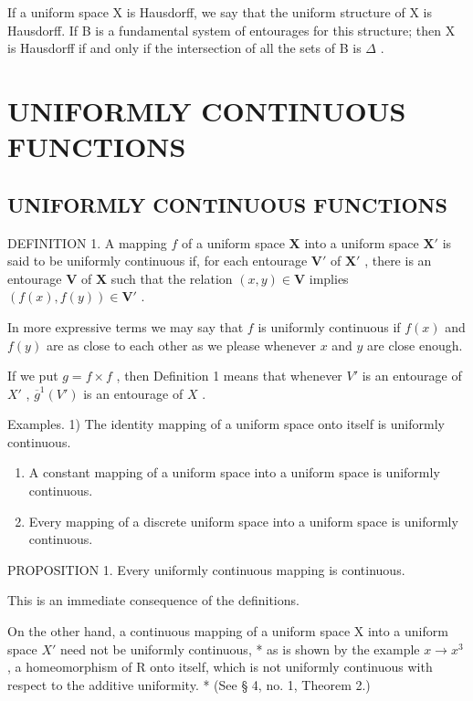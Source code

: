 If a uniform space X is Hausdorff, we say that the uniform structure of X is Hausdorff. If B is a fundamental system of entourages for this structure; then X is Hausdorff if and only if the intersection of all the sets of B is \(\Delta\) .

\section{UNIFORMLY CONTINUOUS FUNCTIONS}

\subsection{UNIFORMLY CONTINUOUS FUNCTIONS}

DEFINITION 1. A mapping \(f\) of a uniform space \(\mathbf{X}\) into a uniform space \(\mathbf{X}'\) is said to be uniformly continuous if, for each entourage \(\mathbf{V}'\) of \(\mathbf{X}'\) , there is an entourage \(\mathbf{V}\) of \(\mathbf{X}\) such that the relation \((x,y)\in \mathbf{V}\) implies \((f(x),f(y))\in \mathbf{V}'\) .

In more expressive terms we may say that \(f\) is uniformly continuous if \(f(x)\) and \(f(y)\) are as close to each other as we please whenever \(x\) and \(y\) are close enough.

If we put \(g = f \times f\) , then Definition 1 means that whenever \(V'\) is an entourage of \(X'\) , \(\overline{g}^1(V')\) is an entourage of \(X\) .

Examples. 1) The identity mapping of a uniform space onto itself is uniformly continuous.

\begin{enumerate}
\def\labelenumi{\arabic{enumi})}
\setcounter{enumi}{1}
\item
  A constant mapping of a uniform space into a uniform space is uniformly continuous.
\item
  Every mapping of a discrete uniform space into a uniform space is uniformly continuous.
\end{enumerate}

PROPOSITION 1. Every uniformly continuous mapping is continuous.

This is an immediate consequence of the definitions.

On the other hand, a continuous mapping of a uniform space X into a uniform space \(X'\) need not be uniformly continuous, * as is shown by the example \(x \to x^{3}\) , a homeomorphism of R onto itself, which is not uniformly continuous with respect to the additive uniformity. * (See § 4, no. 1, Theorem 2.)


